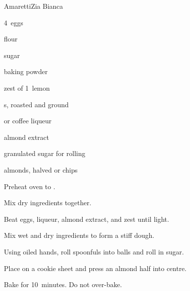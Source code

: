 \begin{recipe}{Amaretti}{Zia Bianca}{}

\begin{ingredients}
\item 4~eggs
\item {} flour
\item {} sugar
\item {} 
\item {} baking powder
\item zest of 1~lemon
\item {} s, roasted and ground
\item {}  or coffee liqueur
\item {} almond extract
\item granulated sugar for rolling
\item almonds, halved or  chips
\end{ingredients}

\begin{directions}
\item Preheat oven to .
\item Mix dry ingredients together.
\item Beat eggs, liqueur, almond extract, and zest until light.
\item Mix wet and dry ingredients to form a stiff dough.
\item Using oiled hands, roll spoonfuls into balls and roll in sugar.
\item Place on a cookie sheet and press an almond half into centre.
\item Bake for 10~minutes. Do not over-bake.
\end{directions}

\end{recipe}

